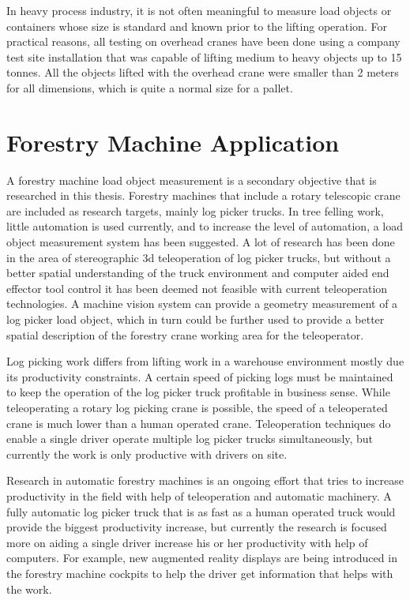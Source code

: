 \documentclass[12pt,a4paper,oneside,pdftex]{report}
\begin{document}
In heavy process industry, it is not often meaningful to measure load objects or containers whose size is standard and known prior to the lifting operation. For practical reasons, all testing on overhead cranes have been done using a company test site installation that was capable of lifting medium to heavy objects up to 15 tonnes. All the objects lifted with the overhead crane were smaller than 2 meters for all dimensions, which is quite a normal size for a pallet.

\section{Forestry Machine Application}
\label{section:forestry_machine_application}

A forestry machine load object measurement is a secondary objective that is researched in this thesis. Forestry machines that include a rotary telescopic crane are included as research targets, mainly log picker trucks. In tree felling work, little automation is used currently, and to increase the level of automation, a load object measurement system has been suggested. A lot of research has been done in the area of stereographic 3d teleoperation of log picker trucks, but without a better spatial understanding of the truck environment and computer aided end effector tool control it has been deemed not feasible with current teleoperation technologies. A machine vision system can provide a geometry measurement of a log picker load object, which in turn could be further used to provide a better spatial description of the forestry crane working area for the teleoperator. 

Log picking work differs from lifting work in a warehouse environment mostly due its productivity constraints. A certain speed of picking logs must be maintained to keep the operation of the log picker truck profitable in business sense. While teleoperating a rotary log picking crane is possible, the speed of a teleoperated crane is much lower than a human operated crane. Teleoperation techniques do enable a single driver operate multiple log picker trucks simultaneously, but currently the work is only productive with drivers on site. 

Research in automatic forestry machines is an ongoing effort that tries to increase productivity in the field with help of teleoperation and automatic machinery. A fully automatic log picker truck that is as fast as a human operated truck would provide the biggest productivity increase, but currently the research is focused more on aiding a single driver increase his or her productivity with help of computers. For example, new augmented reality displays are being introduced in the forestry machine cockpits to help the driver get information that helps with the work. 
\end{document}
